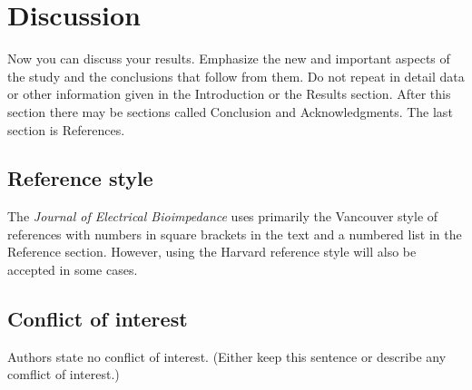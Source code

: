 \documentclass{elbioimp2}
\begin{document}
\section{Discussion}
Now you can discuss your results. Emphasize the new and important
aspects of the study and the conclusions that follow from them. Do not
repeat in detail data or other information given in the Introduction
or the Results section. After this section there may be sections
called Conclusion and Acknowledgments. The last section is References.

\subsection{Reference style}
The \emph{Journal of Electrical Bioimpedance} uses primarily the Vancouver
style of references with numbers in square brackets in the text and a
numbered list in the Reference section.\cite{biomed-req} However, using the
Harvard reference style will also be accepted in some cases.

\subsection{Conflict of interest}
Authors state no conflict of interest. (Either keep this sentence or
describe any comflict of interest.)

\newpage
\nocite{*}
\printbibliography
\end{document}
